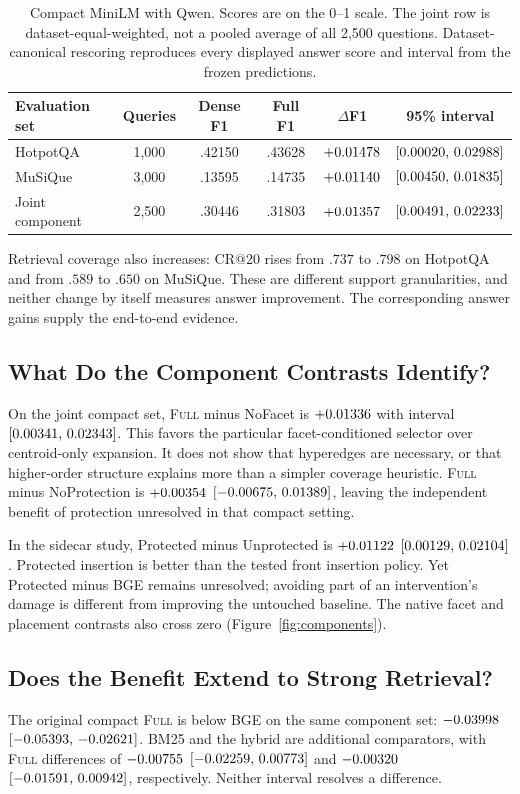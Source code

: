 \documentclass[11pt]{article}
\newcommand{\full}{\textsc{Full}\xspace}
\begin{document}
\begin{table}[t]
\centering\small
\begin{tabular}{@{}lccccc@{}}
\toprule
Evaluation set & Queries & Dense F1 & Full F1 & $\Delta$F1 & 95\% interval\\
\midrule
HotpotQA & 1,000 & .42150 & .43628 & $+0.01478$ & $[0.00020,\,0.02988]$\\
MuSiQue & 3,000 & .13595 & .14735 & $+0.01140$ & $[0.00450,\,0.01835]$\\
Joint component & 2,500 & .30446 & .31803 & $+0.01357$ & $[0.00491,\,0.02233]$\\
\bottomrule
\end{tabular}
\caption{Compact MiniLM with Qwen. Scores are on the 0--1 scale. The joint row
is dataset-equal-weighted, not a pooled average of all 2,500 questions.
Dataset-canonical rescoring reproduces every displayed answer score and
interval from the frozen predictions.}
\label{tab:compact}
\end{table}

Retrieval coverage also increases: CR@20 rises from $.737$ to $.798$ on
HotpotQA and from $.589$ to $.650$ on MuSiQue. These are different support
granularities, and neither change by itself measures answer improvement.
The corresponding answer gains supply the end-to-end evidence.

\subsection{What Do the Component Contrasts Identify?}
On the joint compact set, \full minus NoFacet is $+0.01336$
with interval $[0.00341,\,0.02343]$. This favors the particular facet-conditioned
selector over centroid-only expansion. It does not show that hyperedges are
necessary, or that higher-order structure explains more than a simpler
coverage heuristic. \full minus NoProtection is $+0.00354$
$[-0.00675,\,0.01389]$, leaving the independent benefit of protection unresolved
in that compact setting.

In the sidecar study, Protected minus Unprotected is $+0.01122$
$[0.00129,\,0.02104]$. Protected insertion is better than the tested front
insertion policy. Yet Protected minus BGE remains unresolved; avoiding part of
an intervention's damage is different from improving the untouched baseline.
The native facet and placement contrasts also cross zero
(Figure~\ref{fig:components}).

\subsection{Does the Benefit Extend to Strong Retrieval?}
The original compact \full is below BGE on the same component set:
$-0.03998$ $[-0.05393,\,-0.02621]$. BM25 and the hybrid are additional comparators,
with \full differences of $-0.00755$ $[-0.02259,\,0.00773]$ and
$-0.00320$ $[-0.01591,\,0.00942]$, respectively.
Neither interval resolves a difference.
\end{document}
